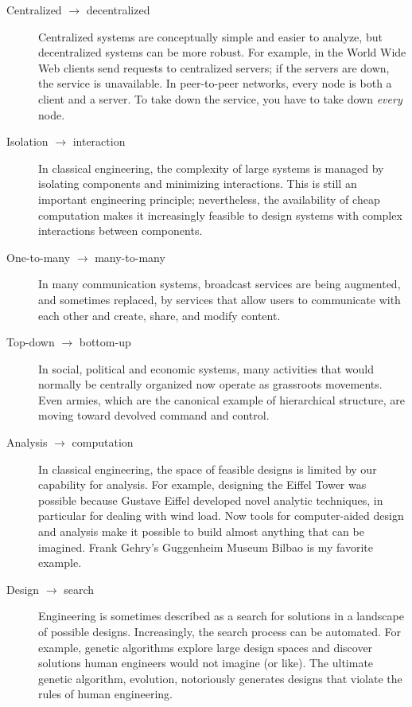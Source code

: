 \documentclass[10pt]{book}
\begin{document}
\begin{description}

\item[Centralized $\rightarrow$ decentralized] Centralized systems are
  conceptually simple and easier to analyze, but decentralized systems
  can be more robust.  For example, in the World Wide Web clients send
  requests to centralized servers; if the servers are down, the
  service is unavailable.  In peer-to-peer networks, every node is
  both a client and a server.  To take down the service, you have to
  take down {\em every} node.
  
\item[Isolation $\rightarrow$ interaction] In classical engineering,
  the complexity of large systems is managed by isolating components
  and minimizing interactions.  This is still an important engineering
  principle; nevertheless, the availability of cheap computation makes
  it increasingly feasible to design systems with complex interactions
  between components.

\item[One-to-many $\rightarrow$ many-to-many] In many communication
  systems, broadcast services are being augmented, and sometimes
  replaced, by services that allow users to communicate with each
  other and create, share, and modify content.  

\item[Top-down $\rightarrow$ bottom-up] In social, political and
  economic systems, many activities that would normally be centrally
  organized now operate as grassroots movements.  Even armies, which
  are the canonical example of hierarchical structure, are moving
  toward devolved command and control.

\item[Analysis $\rightarrow$ computation] In classical engineering,
  the space of feasible designs is limited by our capability for
  analysis.  For example, designing the Eiffel Tower was possible
  because Gustave Eiffel developed novel analytic techniques, in
  particular for dealing with wind load.  Now tools for computer-aided
  design and analysis make it possible to build almost anything that
  can be imagined.  Frank Gehry's Guggenheim Museum Bilbao is my
  favorite example.

\item[Design $\rightarrow$ search] Engineering is sometimes described
  as a search for solutions in a landscape of possible designs.
  Increasingly, the search process can be automated.  For example,
  genetic algorithms explore large design spaces and discover
  solutions human engineers would not imagine (or like).  The ultimate
  genetic algorithm, evolution, notoriously generates designs that
  violate the rules of human engineering.

\end{description}
\end{document}

